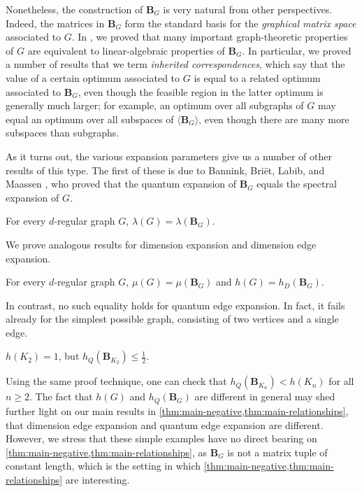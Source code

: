 \documentclass{toc}
\theoremstyle{plain}
\numberwithin{equation}{section}
\theoremstyle{definition}
\newcommand{\tuple}[1]{\mathbf{#1}}
\newcommand{\vB}{\tuple{B}}
\begin{document}
Nonetheless, the construction of $\vB_G$ is very natural from other perspectives. Indeed, the matrices in $\vB_G$ form the standard basis for the \emph{graphical matrix space} associated to $G$. In \cite{moreconnections}, we proved that many important graph-theoretic properties of $G$ are equivalent to linear-algebraic properties of $\vB_G$. In particular, we proved a number of results that we term \emph{inherited correspondences}, which say that the value of a certain optimum associated to $G$ is equal to a related optimum associated to $\vB_G$, even though the feasible region in the latter optimum is generally much larger; for example, an optimum over all subgraphs of $G$ may equal an optimum over all subspaces of $\langle \vB_G\rangle$, even though there are many more subspaces than subgraphs.

As it turns out, the various expansion parameters give us a number of other results of this type. The first of these is due to Bannink, Bri\"{e}t, Labib, and Maassen \cite{quasirandom}, who proved that the quantum expansion of $\vB_G$ equals the spectral expansion of $G$.
\begin{theorem}\label{prop: spectral 
expansion generalization}
For every $d$-regular graph $G$, $\lambda(G)=\lambda(\vB_G)$.
\end{theorem}
We prove analogous results for dimension expansion and dimension edge expansion.
\begin{theorem}\label{thm:graphical-tuple-preserves}
    For every $d$-regular graph $G$, $\mu(G) = \mu(\vB_G)$ and $h(G) = h_D(\vB_G)$.
\end{theorem}

In contrast, no such equality holds for quantum edge expansion. In fact, it fails already for the simplest possible graph, consisting of two vertices and a single edge.
\begin{proposition}\label{prop:hq-k2}
    $h(K_2) =1$, but $h_Q(\vB_{K_2})\leq\frac 12$.
\end{proposition}
Using the same proof technique, one can check that $h_Q(\vB_{K_n}) < h(K_n)$ for all $n \geq 2$. The fact that $h(G)$ and $h_Q(\vB_G)$ are different in general may shed further light on our main results in \cref{thm:main-negative,thm:main-relationships}, that dimension edge expansion and quantum edge expansion are different. However, we stress that these simple examples have no direct bearing on \cref{thm:main-negative,thm:main-relationships}, as $\vB_G$ is not a matrix tuple of constant length, which is the setting in which \cref{thm:main-negative,thm:main-relationships} are interesting.
\end{document}
